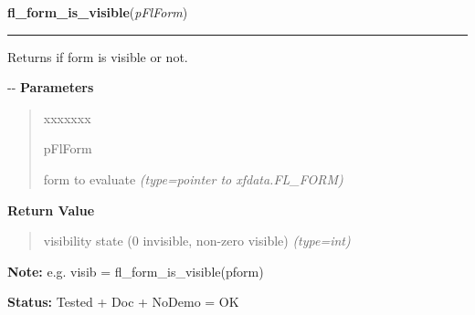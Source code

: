 \hspace{.8\funcindent}\begin{boxedminipage}{\funcwidth}

    \raggedright \textbf{fl\_form\_is\_visible}(\textit{pFlForm})

    \vspace{-1.5ex}

    \rule{\textwidth}{0.5\fboxrule}
\setlength{\parskip}{2ex}

Returns if form is visible or not.

-{}-
\setlength{\parskip}{1ex}
      \textbf{Parameters}
      \vspace{-1ex}

      \begin{quote}
        \begin{Ventry}{xxxxxxx}

          \item[pFlForm]


form to evaluate
            {\it (type=pointer to xfdata.FL\_FORM)}

        \end{Ventry}

      \end{quote}

      \textbf{Return Value}
    \vspace{-1ex}

      \begin{quote}

visibility state (0 invisible, non-zero visible)
      {\it (type=int)}

      \end{quote}

\textbf{Note:} 
e.g. visib = fl\_form\_is\_visible(pform)


\textbf{Status:} 
Tested + Doc + NoDemo = OK


    \end{boxedminipage}

    \label{xformslib:flbasic:fl_form_is_iconified}

    \vspace{0.5ex}


